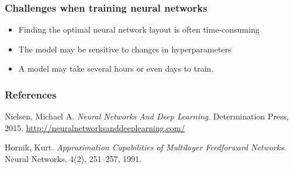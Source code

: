 \documentclass{beamer}
\begin{document}
  \begin{frame}
    \frametitle{Challenges when training neural networks}  
    
   	\begin{itemize}
		\item Finding the optimal neural network layout is often time-consuming
		\item The model may be sensitive to changes in hyperparameters
		\item A model may take several hours or even days to train. 
	\end{itemize}
  \end{frame}  

%   
   \begin{frame}
   	\frametitle{References}
   	\begin{thebibliography}{Hornik, 1991}

   Nielsen, Michael A. {\em Neural Networks And Deep Learning}. Determination Press, 2015. \url{http://neuralnetworksanddeeplearning.com/}
  
   Hornik, Kurt. {\em Approximation Capabilities of Multilayer Feedforward Networks}. Neural Networks, 4(2), 251--257, 1991.
    
	\end{thebibliography}   
   \end{frame}  
\end{document}
